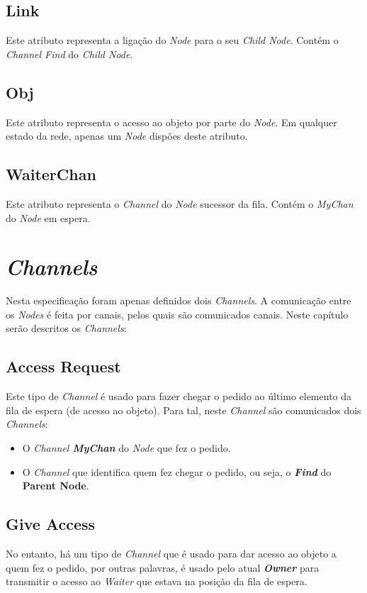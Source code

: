 \subsection*{Link}
\label{especificacao:atr:link}
    Este atributo representa a ligação do \emph{Node} para o seu \emph{Child Node}.
    Contém o \emph{Channel Find} do \emph{Child Node}.


\subsection*{Obj}
\label{especificacao:atr:obj}
    Este atributo representa o acesso ao objeto por parte do \emph{Node}.
    Em qualquer estado da rede, apenas um \emph{Node} dispões deste atributo.

\subsection*{WaiterChan}
\label{especificacao:atr:waiterchan}
    Este atributo representa o \emph{Channel} do \emph{Node} sucessor da fila.
    Contém o \emph{MyChan} do \emph{Node} em espera.


\section{\emph{Channels}}
\label{especificacao:sec:Channels}
Nesta especificação foram apenas definidos dois \emph{Channels}. A comunicação entre os \emph{Nodes} é feita por canais, pelos quais são comunicados canais.
Neste capítulo serão descritos os \emph{Channels}:


\subsection*{Access Request}
Este tipo de \emph{Channel} é usado para fazer chegar o pedido ao último elemento da fila de espera (de acesso ao objeto). 
Para tal, neste \emph{Channel} são comunicados dois \emph{Channels}:
\begin{itemize}
    \item O \emph{Channel \textbf{MyChan}} do \emph{Node} que fez o pedido.
    \item O \emph{Channel} que identifica quem fez chegar o pedido, ou seja, o \emph{\textbf{Find}} do \textbf{Parent Node}.
\end{itemize}


\subsection*{Give Access}
No entanto, há um tipo de \emph{Channel} que é usado para dar acesso ao objeto a quem fez o pedido, por outras palavras, é usado pelo atual \emph{\textbf{Owner}} para transmitir o acesso ao \emph{Waiter} que estava na posição da fila de espera.


